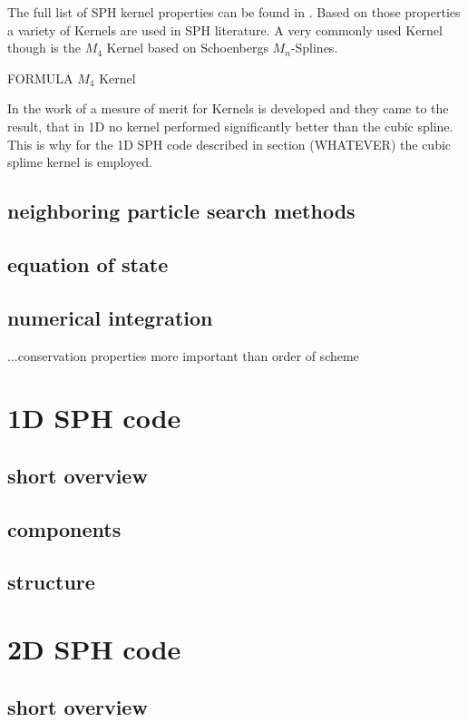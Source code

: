 \documentclass{report}
\begin{document}
The full list of SPH kernel properties can be found in  \cite{Liu2003}.
Based on those properties a variety of Kernels are used in SPH literature. A
very commonly used Kernel though is the $M_4$ Kernel based on Schoenbergs
$M_n$-Splines\cite{Schoenberg1946}.

FORMULA $M_4$ Kernel

In the work of \cite{Fulk1996} a mesure of merit for Kernels is developed and
they came to the result, that in 1D no kernel performed significantly better
than the cubic spline.
This is why for the 1D SPH code described in section (WHATEVER) the cubic
splime kernel is employed.

\subsection{neighboring particle search methods}

\subsection{equation of state}

\subsection{numerical integration}
...conservation properties more important than order of scheme\cite{Monaghan2005}



\section{1D SPH code}
\subsection{short overview}
\subsection{components}
\subsection {structure}
\section{2D SPH code}
\subsection{short overview}
\end{document}
